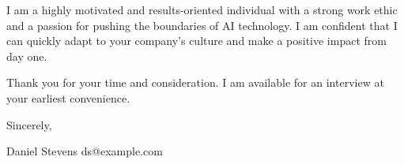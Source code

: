 \documentclass[11pt,a4paper,roman]{moderncv}
\begin{document}
\vspace{1em}
I am a highly motivated and results-oriented individual with a strong work ethic and a passion for pushing the boundaries of AI technology. I am confident that I can quickly adapt to your company's culture and make a positive impact from day one.

\vspace{1em}
Thank you for your time and consideration. I am available for an interview at your earliest convenience.

\vspace{1em}
Sincerely,

\vspace{1em}
Daniel Stevens 
ds@example.com 
\end{document}
